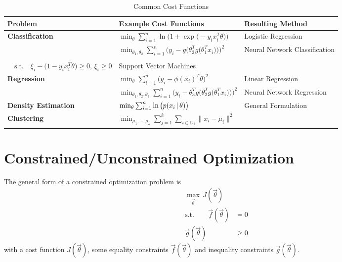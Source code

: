 			\begin{table}
				\centering
				\begin{tabular}{lll}
					\textbf{Problem} & \textbf{Example Cost Functions} & \textbf{Resulting Method} \\ \hline
					\textbf{Classification} & \( \min_\theta \sum_{i = 1}^{n} \ln\Big(1 \! + \exp\big(-y_ix_i^T\theta\big)\Big) \) & Logistic Regression \\
					& \( \min_{\theta_1, \theta_2} \sum_{i = 1}^{n} \bigg( \! y_i - g\Big( \theta_2^T g\big(\theta_1^T x_i\big) \Big) \! \bigg)^2 \) & Neural Network Classification \\
					& \makecell[l]{\(\min_\theta \lVert\theta\rVert^2 + C \sum_{i = 1}^{n} \xi_i\) \\ \( \quad\textrm{s.t.}\quad \xi_i - \big(1 - y_ix_i^T\theta\big) \geq 0,\, \xi_i \geq 0 \)} & Support Vector Machines \\
					\textbf{Regression} & \( \min_\theta \sum_{i = 1}^{n} \big(y_i - \phi(x_i)^T \theta\big)^2 \) & Linear Regression \\
					& \( \min_{\theta_1, \theta_2, \theta_3} \sum_{i = 1}^{n} \bigg( \! y_i - \theta_3^T g\Big( \theta_2^T g\big( \theta_1^T x_i \big) \Big) \! \bigg)^2 \) & Neural Network Regression \\
					\textbf{Density Estimation} & \( \min_\theta \sum_{i = 1}^{n} \ln\big(p(x_i \,\vert\, \theta)\big) \) & General Formulation \\
					\textbf{Clustering} & \( \min_{\mu_1, \cdots, \mu_k} \sum_{j = 1}^{k} \sum_{i \in C_j} \lVert x_i - \mu_i \rVert ^2 \)
				\end{tabular}
				\caption{Common Cost Functions}
				\label{tab:costFunctions}
			\end{table}

	\section{Constrained/Unconstrained Optimization}
		The general form of a constrained optimization problem is
		\begin{align}
			\max\limits_{\vec{\theta}} \, J(\vec{\theta}) & \\
			\textrm{s.t.} \qquad
			\vec{f}(\vec{\theta}) & = 0 \\
			\vec{g}(\vec{\theta}) &\geq 0
		\end{align}
		with a cost function \(J(\vec{\theta})\), some equality constraints \(\vec{f}(\vec{\theta})\) and inequality constraints \(\vec{g}(\vec{\theta})\).

